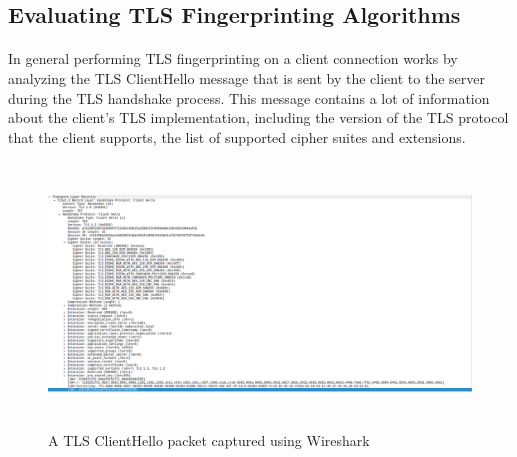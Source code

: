 \documentclass[12pt]{scrbook}
\begin{document}
\subsection{Evaluating TLS Fingerprinting Algorithms}

\paragraph{}
In general performing TLS fingerprinting on a client connection works by analyzing the TLS ClientHello
message that is sent by the client to the server during the TLS handshake
process. This message contains a lot of information about the client's TLS
implementation, including the version of the TLS protocol that the client
supports, the list of supported cipher suites and extensions.
\begin{figure}[!htb]
  \centering
  \includegraphics[height=7cm]{./images/tls_client_hello_wireshark.png}
  \caption{A TLS ClientHello packet captured using Wireshark}
\end{figure}
\end{document}
